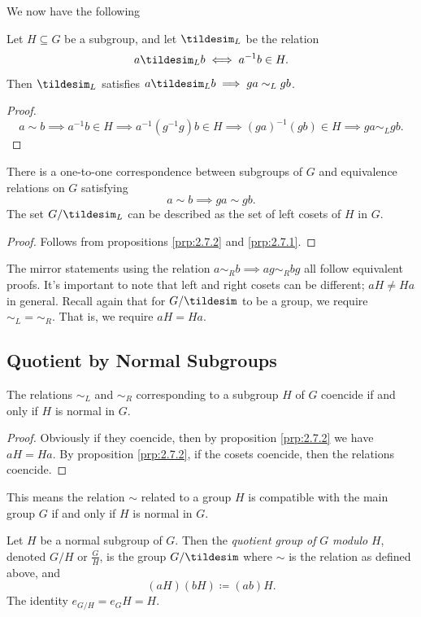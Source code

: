 We now have the following
\begin{proposition}\label{prp:2.7.3}
	Let $H\subseteq G$ be a subgroup, and let $\tildesim_L$ be the relation
	\[
		a \tildesim_L b \iff a^{-1}b\in H
	.\]
	Then $\tildesim_L$ satisfies $a \tildesim_L b \implies ga \sim_L gb$.
\end{proposition}
\begin{proof}
	\[
		a\sim b \implies a^{-1}b\in H \implies a^{-1}(g^{-1}g)b\in H \implies (ga)^{-1}(gb)\in H \implies ga \sim_L gb
	.\]
\end{proof}
\begin{proposition}\label{prp:2.7.4}
	There is a one-to-one correspondence between subgroups of $G$ and equivalence relations on $G$ satisfying
	\[
		a\sim b \implies ga\sim gb
	.\]
	The set $G /\tildesim_L$ can be described as the set of left cosets of $H$ in $G$.
\end{proposition}
\begin{proof}
	Follows from propositions \ref{prp:2.7.2} and \ref{prp:2.7.1}.
\end{proof}
The mirror statements using the relation $a\sim_R b \implies ag \sim_R bg$ all follow equivalent proofs. It's important to note that left and right cosets can be different; $aH\neq Ha$ in general. Recall again that for $G /\tildesim $ to be a group, we require $\sim_L = \sim_R$. That is, we require $aH=Ha$.

\subsection{Quotient by Normal Subgroups}
\begin{proposition}\label{prp:2.7.5}
	The relations $\sim_L$ and $\sim_R$ corresponding to a subgroup $H$ of $G$ coencide if and only if $H$ is normal in $G$.
\end{proposition}
\begin{proof}
	Obviously if they coencide, then by proposition \ref{prp:2.7.2} we have $aH=Ha$. By proposition \ref{prp:2.7.2}, if the cosets coencide, then the relations coencide.
\end{proof}
This means the relation $\sim $ related to a group $H$ is compatible with the main group $G$ if and only if $H$ is normal in $G$.
\begin{definition}\label{dfn:2.7.2}
	Let $H$ be a normal subgroup of $G$. Then the \emph{quotient group of} $G$ \emph{modulo }$H$, denoted $G /H$ or $\frac{G}{H}$, is the group $G /\tildesim $ where $\sim $ is the relation as defined above, and
	\[
		(aH)(bH)\coloneqq (ab)H
	.\]
	The identity $e_{G /H}=e_GH=H$.
\end{definition}

